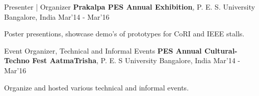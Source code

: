 \begin{cventries}
	\cventry
	{Presenter | Organizer}
	{\textbf{Prakalpa PES Annual Exhibition}\href{http://pes.edu/clubs/prakalpa/}, P. E. S. University}
	{Bangalore, India}
	{Mar'14 - Mar'16}
	{
		\begin{cvitems}
		\item{Poster presentions, showcase demo's of prototypes for CoRI and IEEE stalls.}
		\end{cvitems}
	}

	\cventry
	{Event Organizer, Technical and Informal Events}
	{\textbf{PES Annual Cultural- Techno Fest AatmaTrisha}\href{http://pes.edu/clubs/atmatrisha/}, P. E. S University}
	{Bangalore, India}
	{Mar'14 - Mar'16}
	{
		\begin{cvitems}
		\item{Organize and hosted various technical and informal events.}
		\end{cvitems}
	}

\end{cventries}
